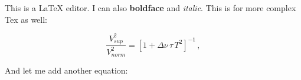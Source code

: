 This is a LaTeX editor. I can also \textbf{boldface} and \textit{italic}. This is for more complex Tex as well:

\begin{equation}
\frac{V_{ sup}^2}{V_{ norm}^2} = [1 + \Delta \nu \, \tau \, T^2 ]^{-1} \, ,
\end{equation}

And let me add another equation:

